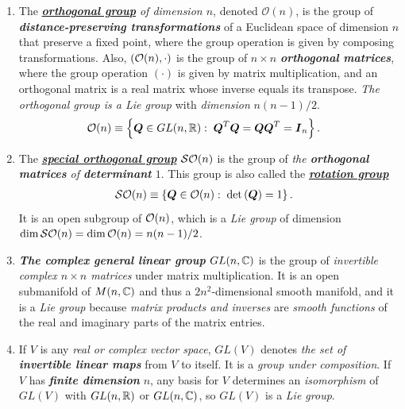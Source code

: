 \documentclass[11pt]{article}
\begin{document}
\begin{itemize}
\begin{example}
\begin{enumerate}
\item The \emph{\underline{\textbf{orthogonal group}} of dimension $n$}, denoted $\mathcal{O}(n)$, is the group of \emph{\textbf{distance-preserving transformations}} of a Euclidean space of dimension $n$ that preserve a fixed point, where the group operation is given by composing transformations. Also, $({\mathcal O}(n), \cdot)$ is the group of $n\times n$ \emph{\textbf{orthogonal matrices}}, where the group operation $(\cdot)$ is given by matrix multiplication, and an orthogonal matrix is a real matrix whose inverse equals its transpose. \emph{The orthogonal group is a Lie group} with \emph{dimension} $n(n-1)/2$.
\begin{align*}
{\mathcal O}(n) &\equiv \left\{\boldsymbol{Q}\in GL(n, {\mathbb R}):\;  \boldsymbol{Q}^{T}\boldsymbol{Q} = \boldsymbol{Q}\boldsymbol{Q}^{T} = \boldsymbol{I}_{n}\right\}.
\end{align*}

\item The \underline{\emph{\textbf{special orthogonal group}}} ${\mathcal S}{\mathcal O}(n)$ is the group of \emph{the \textbf{orthogonal matrices} of \textbf{determinant} $1$}. This group is also called the \underline{\emph{\textbf{rotation group}}}
\begin{align*}
{\mathcal S}{\mathcal O}(n) &\equiv \left\{\boldsymbol{Q}\in {\mathcal O}(n):\;  \det\left(\boldsymbol{Q}\right)= 1\right\}.
\end{align*} It is an open subgroup of ${\mathcal O}(n)$, which is a \emph{Lie group} of dimension $\dim{{\mathcal S}{\mathcal O}(n)}= \dim{{\mathcal O}(n)} = n(n-1)/2$.

\item \emph{\textbf{The complex general linear group}} $GL(n, {\mathbb C})$ is the group of \emph{invertible complex $n\times n$ matrices} under matrix multiplication. It is an open submanifold of $M(n, {\mathbb C})$ and thus a $2n^2$-dimensional smooth manifold, and it is a \emph{Lie group} because \emph{matrix products and inverses} are \emph{smooth functions} of the real and imaginary parts of the matrix entries.

\item If $V$ is any \emph{real or complex vector space}, $GL(V)$ denotes \emph{the set of \textbf{invertible linear maps}} from $V$ to itself. It is a \emph{group under composition}.  If $V$ has \emph{\textbf{finite dimension}} $n$, any basis for $V$ determines an \emph{isomorphism} of $GL(V)$ with $GL(n, {\mathbb R})$  or $GL(n, {\mathbb C})$, so $GL(V)$ is a \emph{Lie group}. 


\end{enumerate}
\end{example}
\end{itemize}
\end{document}
